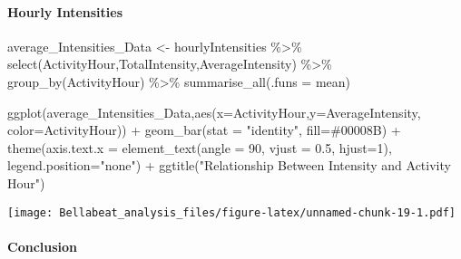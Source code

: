 \documentclass[
]{article}
\newenvironment{Shaded}{\begin{snugshade}}{\end{snugshade}}
\newcommand{\AttributeTok}[1]{\textcolor[rgb]{0.77,0.63,0.00}{#1}}
\newcommand{\DecValTok}[1]{\textcolor[rgb]{0.00,0.00,0.81}{#1}}
\newcommand{\FloatTok}[1]{\textcolor[rgb]{0.00,0.00,0.81}{#1}}
\newcommand{\FunctionTok}[1]{\textcolor[rgb]{0.00,0.00,0.00}{#1}}
\newcommand{\NormalTok}[1]{#1}
\newcommand{\OtherTok}[1]{\textcolor[rgb]{0.56,0.35,0.01}{#1}}
\newcommand{\SpecialCharTok}[1]{\textcolor[rgb]{0.00,0.00,0.00}{#1}}
\newcommand{\StringTok}[1]{\textcolor[rgb]{0.31,0.60,0.02}{#1}}
\begin{document}
\hypertarget{hourly-intensities}{%
\paragraph{Hourly Intensities}\label{hourly-intensities}}

\begin{Shaded}
\begin{Highlighting}[]
\NormalTok{average\_Intensities\_Data }\OtherTok{\textless{}{-}}\NormalTok{ hourlyIntensities }\SpecialCharTok{\%\textgreater{}\%} 
  \FunctionTok{select}\NormalTok{(ActivityHour,TotalIntensity,AverageIntensity) }\SpecialCharTok{\%\textgreater{}\%} 
  \FunctionTok{group\_by}\NormalTok{(ActivityHour) }\SpecialCharTok{\%\textgreater{}\%} 
  \FunctionTok{summarise\_all}\NormalTok{(}\AttributeTok{.funs =}\NormalTok{ mean)}

\FunctionTok{ggplot}\NormalTok{(average\_Intensities\_Data,}\FunctionTok{aes}\NormalTok{(}\AttributeTok{x=}\NormalTok{ActivityHour,}\AttributeTok{y=}\NormalTok{AverageIntensity, }\AttributeTok{color=}\NormalTok{ActivityHour)) }\SpecialCharTok{+} 
  \FunctionTok{geom\_bar}\NormalTok{(}\AttributeTok{stat =} \StringTok{"identity"}\NormalTok{, }\AttributeTok{fill=}\StringTok{\textquotesingle{}\#00008B\textquotesingle{}}\NormalTok{) }\SpecialCharTok{+}
  \FunctionTok{theme}\NormalTok{(}\AttributeTok{axis.text.x =} \FunctionTok{element\_text}\NormalTok{(}\AttributeTok{angle =} \DecValTok{90}\NormalTok{, }\AttributeTok{vjust =} \FloatTok{0.5}\NormalTok{, }\AttributeTok{hjust=}\DecValTok{1}\NormalTok{),}
        \AttributeTok{legend.position=}\StringTok{"none"}\NormalTok{) }\SpecialCharTok{+}
  \FunctionTok{ggtitle}\NormalTok{(}\StringTok{"Relationship Between Intensity and Activity Hour"}\NormalTok{)}
\end{Highlighting}
\end{Shaded}

\texttt{[image: Bellabeat\_analysis\_files/figure-latex/unnamed-chunk-19-1.pdf]}

\hypertarget{conclusion}{%
\paragraph{Conclusion}\label{conclusion}}
\end{document}
